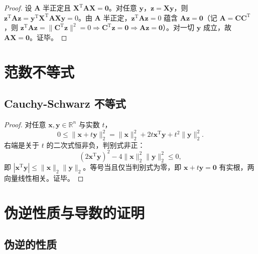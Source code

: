 \begin{proof}
设 $\boldsymbol{A}$ 半正定且 $\boldsymbol{X}^{\mathrm{T}}\boldsymbol{A}\boldsymbol{X} = \boldsymbol{0}$。对任意 $\boldsymbol{y}$，$\boldsymbol{z} = \boldsymbol{X}\boldsymbol{y}$，则 $\boldsymbol{z}^{\mathrm{T}}\boldsymbol{A}\boldsymbol{z} = \boldsymbol{y}^{\mathrm{T}}\boldsymbol{X}^{\mathrm{T}}\boldsymbol{A}\boldsymbol{X}\boldsymbol{y} = 0$。由 $\boldsymbol{A}$ 半正定，$\boldsymbol{z}^{\mathrm{T}}\boldsymbol{A}\boldsymbol{z} = 0$ 蕴含 $\boldsymbol{A}\boldsymbol{z} = \boldsymbol{0}$（记 $\boldsymbol{A} = \boldsymbol{C}\boldsymbol{C}^{\mathrm{T}}$，则 $\boldsymbol{z}^{\mathrm{T}}\boldsymbol{A}\boldsymbol{z} = \|\boldsymbol{C}^{\mathrm{T}}\boldsymbol{z}\|^{2} = 0\Rightarrow \boldsymbol{C}^{\mathrm{T}}\boldsymbol{z} = \boldsymbol{0}\Rightarrow \boldsymbol{A}\boldsymbol{z} = \boldsymbol{0}$）。对一切 $\boldsymbol{y}$ 成立，故 $\boldsymbol{A}\boldsymbol{X} = \boldsymbol{0}$。证毕。
\end{proof}

\section{范数不等式}
\label{sec:范数证明}

\subsection*{Cauchy-Schwarz 不等式}

\begin{proof}
对任意 $\boldsymbol{x},\boldsymbol{y}\in\mathbb{R}^n$ 与实数 $t$，
\[
0 \leq \|\boldsymbol{x}+t\boldsymbol{y}\|_2^{2} = \|\boldsymbol{x}\|_2^{2}+2t\boldsymbol{x}^{\mathrm{T}}\boldsymbol{y}+t^{2}\|\boldsymbol{y}\|_2^{2}.
\]
右端是关于 $t$ 的二次式恒非负，判别式非正：
\[
(2\boldsymbol{x}^{\mathrm{T}}\boldsymbol{y})^{2}-4\|\boldsymbol{x}\|_2^{2}\|\boldsymbol{y}\|_2^{2}\leq 0,
\]
即 $|\boldsymbol{x}^{\mathrm{T}}\boldsymbol{y}|\leq\|\boldsymbol{x}\|_2\|\boldsymbol{y}\|_2$。等号当且仅当判别式为零，即 $\boldsymbol{x}+t\boldsymbol{y} = \boldsymbol{0}$ 有实根，两向量线性相关。证毕。
\end{proof}

\section{伪逆性质与导数的证明}
\label{sec:伪逆证明}

\subsection*{伪逆的性质}

